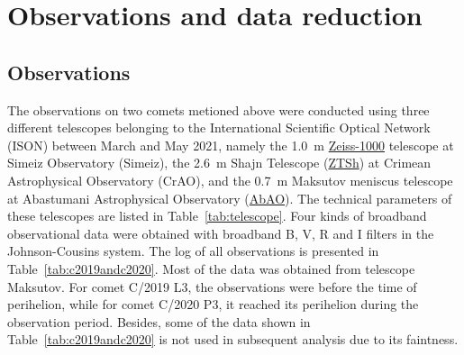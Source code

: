\section{Observations and data reduction} \label{sec:obs_data}

\subsection{Observations}

The observations on two comets metioned above were conducted using three different telescopes belonging to the International Scientific Optical Network (ISON) between March and May 2021, namely the {\SI{1.0}{\m}} {\href{https://link.springer.com/content/pdf/10.1134/S1990341320040112.pdf}{Zeiss-1000}} telescope at Simeiz Observatory (Simeiz), the {\SI{2.6}{\m}} Shajn Telescope ({\href{https://crao.ru/index.php/en/telescopes-en/ztsh-en}{ZTSh}}) at Crimean Astrophysical Observatory (CrAO), and the {\SI{0.7}{\m}} Maksutov meniscus telescope at Abastumani Astrophysical Observatory ({\href{https://www.oato.inaf.it/blazars/webt/abastumani-astrophysical-observatory-georgia-fsu/}{AbAO}}). The technical parameters of these telescopes are listed in Table~\ref{tab:telescope}. Four kinds of broadband observational data were obtained with broadband B, V, R and I filters in the Johnson-Cousins system. The log of all observations is presented in Table~\ref{tab:c2019andc2020}. Most of the data was obtained from telescope Maksutov. For comet C/2019 L3, the observations were before the time of perihelion, while for comet C/2020 P3, it reached its perihelion during the observation period. Besides, some of the data shown in Table~\ref{tab:c2019andc2020} is not used in subsequent analysis due to its faintness. 

